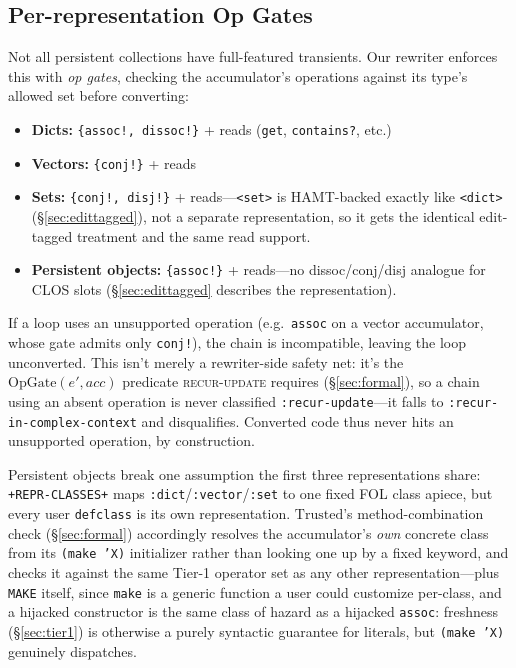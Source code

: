 \documentclass[sigplan,review,anonymous]{acmart}
\begin{document}
\subsection{Per-representation Op Gates}
\label{sec:opgates}
Not all persistent collections have full-featured transients. Our rewriter enforces this with \emph{op gates}, checking the accumulator's operations against its type's allowed set before converting:
\begin{itemize}
    \item \textbf{Dicts:} \texttt{\{assoc!, dissoc!\}} + reads (\texttt{get}, \texttt{contains?}, etc.)
    \item \textbf{Vectors:} \texttt{\{conj!\}} + reads
    \item \textbf{Sets:} \texttt{\{conj!, disj!\}} + reads---\texttt{<set>} is HAMT-backed exactly like \texttt{<dict>} (§\ref{sec:edittagged}), not a separate representation, so it gets the identical edit-tagged treatment and the same read support.
    \item \textbf{Persistent objects:} \texttt{\{assoc!\}} + reads---no dissoc/conj/disj analogue for CLOS slots (§\ref{sec:edittagged} describes the representation).
\end{itemize}
If a loop uses an unsupported operation (e.g.\ \texttt{assoc} on a vector accumulator, whose gate admits only \texttt{conj!}), the chain is incompatible, leaving the loop unconverted. This isn't merely a rewriter-side safety net: it's the $\mathrm{OpGate}(e', acc)$ predicate \textsc{recur-update} requires (§\ref{sec:formal}), so a chain using an absent operation is never classified \texttt{:recur-update}---it falls to \texttt{:recur-in-complex-context} and disqualifies. Converted code thus never hits an unsupported operation, by construction.

Persistent objects break one assumption the first three representations share: \texttt{+REPR-CLASSES+} maps \texttt{:dict}/\texttt{:vector}/\texttt{:set} to one fixed FOL class apiece, but every user \texttt{defclass} is its own representation. $\mathrm{Trusted}$'s method-combination check (§\ref{sec:formal}) accordingly resolves the accumulator's \emph{own} concrete class from its \texttt{(make 'X)} initializer rather than looking one up by a fixed keyword, and checks it against the same Tier-1 operator set as any other representation---plus \texttt{MAKE} itself, since \texttt{make} is a generic function a user could customize per-class, and a hijacked constructor is the same class of hazard as a hijacked \texttt{assoc}: freshness (\S\ref{sec:tier1}) is otherwise a purely syntactic guarantee for literals, but \texttt{(make 'X)} genuinely dispatches.
\end{document}
